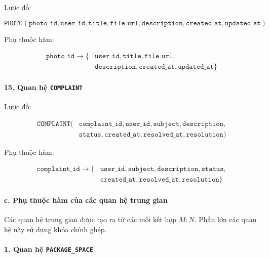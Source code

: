 Lược đồ:

$$ \texttt{PHOTO}( \texttt{photo\_id}, \texttt{user\_id}, \texttt{title}, \texttt{file\_url}, \texttt{description}, \texttt{created\_at}, \texttt{updated\_at}) $$

Phụ thuộc hàm:

$$
\begin{aligned}
\texttt{photo\_id} \rightarrow \{ & \texttt{user\_id}, \texttt{title}, \texttt{file\_url}, \\
& \texttt{description}, \texttt{created\_at}, \texttt{updated\_at} \}
\end{aligned}
$$

\paragraph{15. Quan hệ \texttt{COMPLAINT}}\mbox{}\par

Lược đồ:

$$
\begin{aligned}
\texttt{COMPLAINT}( & \texttt{complaint\_id}, \texttt{user\_id}, \texttt{subject}, \texttt{description}, \\
& \texttt{status}, \texttt{created\_at}, \texttt{resolved\_at}, \texttt{resolution} )
\end{aligned}
$$

Phụ thuộc hàm:

$$
\begin{aligned}
\texttt{complaint\_id} \rightarrow \{ & \texttt{user\_id}, \texttt{subject}, \texttt{description}, \texttt{status}, \\
& \texttt{created\_at}, \texttt{resolved\_at}, \texttt{resolution} \}
\end{aligned}
$$

\paragraph{c. Phụ thuộc hàm của các quan hệ trung gian}\mbox{}\par

Các quan hệ trung gian được tạo ra từ các mối kết hợp $M:N$. Phần lớn các quan hệ này sử dụng khóa chính ghép.

\paragraph{1. Quan hệ \texttt{PACKAGE\_SPACE}}\mbox{}\par

